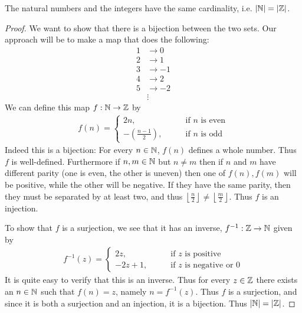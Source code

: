 \documentclass[../../textbook.tex]{subfiles}
\begin{document}
\begin{theorem}
The natural numbers and the integers have the same cardinality, i.e. $\left|\mathbb{N}\right|=\left|\mathbb{Z}\right|$.
\end{theorem}
\begin{proof}
We want to show that there is a bijection between the two sets. Our approach will be to make a map that does the following:
\begin{align*}
    1 &\to 0 \\
    2 &\to 1 \\
    3 &\to -1 \\
    4 &\to 2 \\
    5 &\to -2 \\
    &\vdots
\end{align*}
We can define this map $f:\mathbb{N}\to \mathbb{Z}$ by
\begin{align*}
    f(n) = \begin{cases}
    2n, \qquad &\text{if $n$ is even} \\
    -\left( \frac{n-1}{2} \right), \qquad &\text{if $n$ is odd}
    \end{cases}
\end{align*}
Indeed this is a bijection: For every $n \in \mathbb{N}$, $f(n)$ defines a whole number. Thus $f$ is well-defined. Furthermore if $n, m \in \mathbb{N}$ but $n \neq m$ then if $n$ and $m$ have different parity (one is even, the other is uneven) then one of $f(n),f(m)$ will be positive, while the other will be negative. If they have the same parity, then they must be separated by at least two, and thus $\left\lfloor \frac{n}{2} \right\rfloor \neq \left\lfloor \frac{m}{2} \right\rfloor$. Thus $f$ is an injection.

To show that $f$ is a surjection, we see that it has an inverse, $f^{-1}:\mathbb{Z} \to \mathbb{N}$ given by
\begin{align*}
    f^{-1}(z)=\begin{cases}
    2z, \qquad &\text{if $z$ is positive} \\
    -2z+1, \qquad &\text{if $z$ is negative or 0}
    \end{cases}
\end{align*}
It is quite easy to verify that this is an inverse. Thus for every $z\in \mathbb{Z}$ there exists an $n\in \mathbb{N}$ such that $f(n)=z$, namely $n=f^{-1}(z)$. Thus $f$ is a surjection, and since it is both a surjection and an injection, it is a bijection. Thus $\left|\mathbb{N}\right|=\left|\mathbb{Z}\right|$.
\end{proof}
\end{document}
